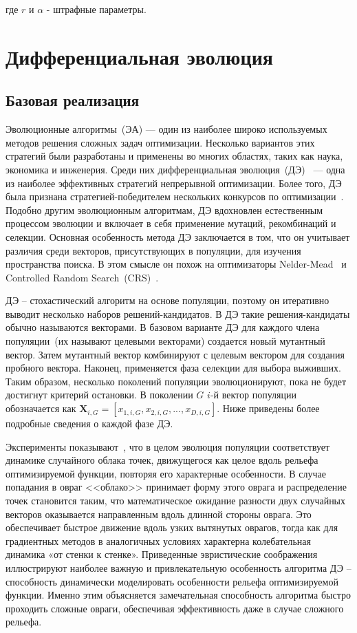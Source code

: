 \documentclass{llncs}
\begin{document}
где $r$ и $\alpha$ - штрафные параметры.

\section{Дифференциальная эволюция}\label{sec:sym:de}
\subsection{Базовая реализация}\label{sec:sym:mod}

Эволюционные алгоритмы~(ЭА) — один из наиболее широко используемых методов решения сложных задач оптимизации. Несколько вариантов этих стратегий были разработаны и применены во многих областях, таких как наука, экономика и инженерия. Среди них дифференциальная эволюция~(ДЭ)~\cite{storn:de} — одна из наиболее эффективных стратегий непрерывной оптимизации. Более того, ДЭ была признана стратегией-победителем нескольких конкурсов по оптимизации~\cite{das:de}. Подобно другим эволюционным алгоритмам, ДЭ вдохновлен естественным процессом эволюции и включает в себя применение мутаций, рекомбинаций и селекции. Основная особенность метода ДЭ заключается в том, что он учитывает различия среди векторов, присутствующих в популяции, для изучения пространства поиска. В этом смысле он похож на оптимизаторы Nelder-Mead~\cite{nelder:simplex} и Controlled Random Search~(CRS)~\cite{price:global}.

ДЭ -- стохастический алгоритм на основе популяции, поэтому он итеративно выводит несколько наборов решений-кандидатов. В ДЭ такие решения-кандидаты обычно называются векторами. В базовом варианте ДЭ для каждого члена популяции~(их называют целевыми векторами) создается новый мутантный вектор. Затем мутантный вектор комбинируют с целевым вектором для создания пробного вектора. Наконец, применяется фаза селекции для выбора выживших. Таким образом, несколько поколений популяции эволюционируют, пока не будет достигнут критерий остановки. В поколении $G$ $i$-й вектор популяции обозначается как $\textbf{X}_{i,G} = [x_{1,i,G}, x_{2,i,G}, ..., x_{D,i,G}]$. Ниже приведены более подробные сведения о каждой фазе ДЭ.

Эксперименты показывают~\cite{storn:de_practical}, что в целом эволюция популяции соответствует динамике случайного облака точек, движущегося как целое вдоль рельефа оптимизируемой функции, повторяя его характерные особенности. В случае попадания в овраг <<облако>> принимает форму этого оврага и распределение точек становится таким, что математическое ожидание разности двух случайных векторов оказывается направленным вдоль длинной стороны оврага. Это обеспечивает быстрое движение вдоль узких вытянутых оврагов, тогда как для градиентных методов в аналогичных условиях характерна колебательная динамика «от стенки к стенке». Приведенные эвристические соображения иллюстрируют наиболее важную и привлекательную особенность алгоритма ДЭ -- способность динамически моделировать особенности рельефа оптимизируемой функции. Именно этим объясняется замечательная способность алгоритма быстро проходить сложные овраги, обеспечивая эффективность даже в случае сложного рельефа.
\end{document}

